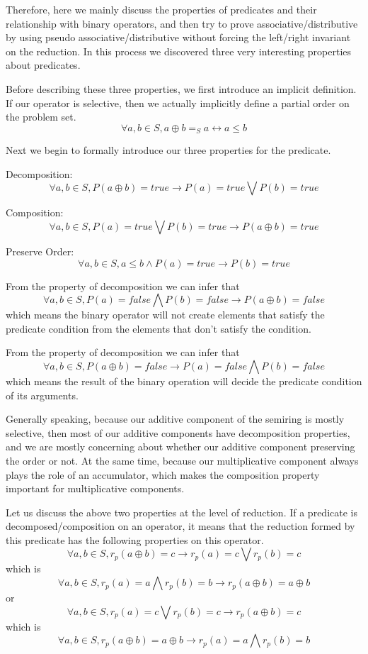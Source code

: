 \documentclass[a4paper,12pt,twoside,openright]{report}
\newcommand{\e}[2]{
\begin{equation}
  \label{#1} 
  #2
\end{equation}
}
\begin{document}
Therefore, here we mainly discuss the properties of predicates and their relationship with binary operators, and then try to prove associative/distributive by using pseudo associative/distributive without forcing the left/right invariant on the reduction. In this process we discovered three very interesting properties about predicates. 

Before describing these three properties, we first introduce an implicit definition. If our operator is selective, then we actually implicitly define a partial order on the problem set.
\[\forall a,b \in S, a \oplus b =_S a \leftrightarrow a \leq b\]

Next we begin to formally introduce our three properties for the predicate.

Decomposition: \e{pr:def:decomposition}{\forall a,b \in S, P(a \oplus b)= true \rightarrow P(a) = true \bigvee P (b) = true}
Composition: \e{pr:def:composition}{\forall a,b \in S, P(a) = true \bigvee P (b) = true \rightarrow P(a \oplus b)= true}
Preserve Order: \e{pr:def:preserve_order}{\forall a,b \in S, a \leq b \wedge P(a) = true \rightarrow P(b) = true}
From the property of decomposition we can infer that \e{pr:proof:decomposition_contra}{\forall a,b \in S, P(a) = false \bigwedge P (b) = false \rightarrow P(a \oplus b)= false} which means the binary operator will not create elements that satisfy the predicate condition from the elements that don't satisfy the condition.

From the property of decomposition we can infer that \e{pr:proof:composition_contra}{\forall a,b \in S, P(a \oplus b)= false \rightarrow P(a) = false \bigwedge P (b) = false} which means the result of the binary operation will decide the predicate condition of its arguments.

Generally speaking, because our additive component of the semiring is mostly selective, then most of our additive components have decomposition properties, and we are mostly concerning about whether our additive component preserving the order or not. At the same time, because our multiplicative component always plays the role of an accumulator, which makes the composition property important for multiplicative components.

Let us discuss the above two properties at the level of reduction. If a predicate is decomposed/composition on an operator, it means that the reduction formed by this predicate has the following properties on this operator.
\[\forall a,b \in S, r_p(a\oplus b) = c \rightarrow r_p(a) = c \bigvee r_p (b) = c\] 
which is 
\[\forall a,b \in S, r_p(a) = a \bigwedge r_p (b) = b \rightarrow r_p(a \oplus b)= a \oplus b\]
or
\[\forall a,b \in S, r_p(a) = c \bigvee r_p (b) = c \rightarrow r_p(a \oplus b)= c\]
which is 
\[\forall a,b \in S, r_p(a\oplus b) = a \oplus b \rightarrow r_p(a) = a \bigwedge r_p (b) = b\]
\end{document}
